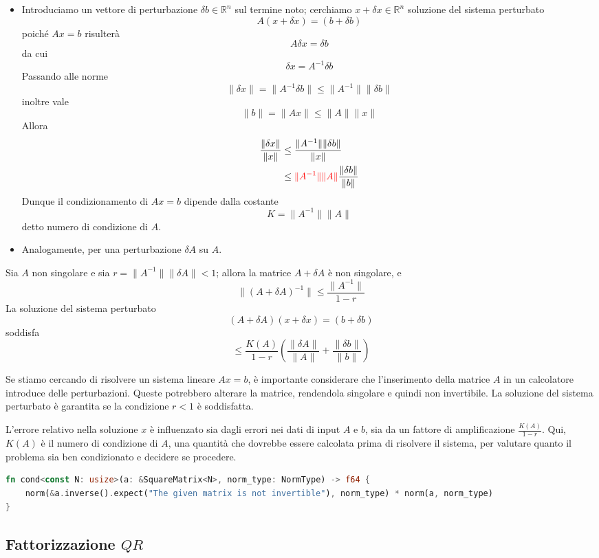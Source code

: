 \documentclass{article}
\begin{document}
\begin{itemize}
    \item Introduciamo un vettore di perturbazione $\delta b\in \mathbb{R}^n$
        sul termine noto; cerchiamo $x+\delta x\in \mathbb{R}^n$ soluzione del
        sistema perturbato 
        $$A(x+\delta x)=(b+\delta b)$$
        poiché $Ax=b$ risulterà
        $$A\delta x=\delta b$$
        da cui 
        $$\delta x=A^{-1}\delta b$$
        Passando alle norme 
        $$\lVert \delta x\rVert=\lVert A^{-1}\delta b\rVert\leq \lVert
        A^{-1}\rVert \lVert \delta b\rVert$$
        inoltre vale 
        $$\lVert b\rVert=\lVert Ax\rVert\leq \lVert A\rVert \lVert x\rVert$$
        Allora 
        $$
        \begin{aligned}
            \frac{\lVert \delta x\rVert}{\lVert x\rVert}&\leq \frac{\lVert
            A^{-1}\rVert \lVert \delta b\rVert}{\lVert x\rVert} \\ 
                                                        &\leq {\color{red}\lVert
                                                        A^{-1}\rVert \lVert A\rVert}\frac{\lVert \delta
                                                b\rVert}{\lVert b\rVert}
        \end{aligned}
        $$
        Dunque il condizionamento di $Ax=b$ dipende dalla costante 
        $$K=\lVert A^{-1}\rVert \lVert A\rVert$$
        detto numero di condizione di $A$.
    \item Analogamente, per una perturbazione $\delta A$ su $A$.
\end{itemize}

\begin{theorem}
    Sia $A$ non singolare e sia $r=\lVert A^{-1}\rVert \lVert \delta
    A\rVert<1$; allora la matrice $A+\delta A$ è non singolare, e 
    $$\lVert (A+\delta A)^{-1}\rVert\leq \frac{\lVert A^{-1}\rVert}{1-r}$$
    La soluzione del sistema perturbato
    $$(A+\delta A)(x+\delta x)=(b+\delta b)$$
    soddisfa 
    $$\leq \frac{K(A)}{1-r}\left(\frac{\lVert \delta A\rVert}{\lVert
    A\rVert}+\frac{\lVert \delta b\rVert}{\lVert b\rVert}\right)$$
\end{theorem}
Se stiamo cercando di risolvere un sistema lineare $Ax=b$, è importante
considerare che l'inserimento della matrice $A$ in un calcolatore introduce
delle perturbazioni. Queste potrebbero alterare la matrice, rendendola 
singolare e quindi non invertibile. La soluzione del sistema perturbato è
garantita se la condizione $r<1$ è soddisfatta.

L'errore relativo nella soluzione $x$ è influenzato sia dagli errori nei dati
di input $A$ e $b$, sia da un fattore di amplificazione $\frac{K(A)}{1-r}$.
Qui, $K(A)$ è il numero di condizione di $A$, una quantità che dovrebbe essere
calcolata prima di risolvere il sistema, per valutare quanto il problema sia
ben condizionato e decidere se procedere.

\begin{lstlisting}[language=Rust]
fn cond<const N: usize>(a: &SquareMatrix<N>, norm_type: NormType) -> f64 {
    norm(&a.inverse().expect("The given matrix is not invertible"), norm_type) * norm(a, norm_type)
}
\end{lstlisting}
\subsection{Fattorizzazione $QR$}
\end{document}
